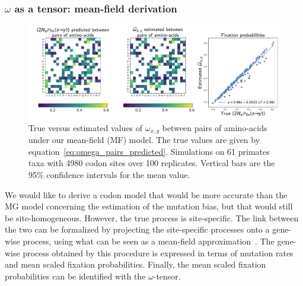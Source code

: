 \documentclass{article}
\newcommand{\aaSource}{x}
\newcommand{\aaTarget}{y}
\begin{document}
\subsubsection{\texorpdfstring{$\omega$}{ω} as a tensor: mean-field derivation}

\begin{figure}[!htb]
 \centering
 \includegraphics[width=\linewidth, page=1]{figure3}
 \caption[Estimation of fixation probability]{
  True versus estimated values of $\omega_{\aaSource, \aaTarget}$ between pairs of amino-acids under our mean-field (MF) model.
  The true values are given by equation~\ref{eq:omega_pairs_predicted}.
  Simulations on 61 primates taxa with 4980 codon sites over 100 replicates.
Vertical bars are the 95\% confidence intervals for the mean value.
 }
 \label{fig:omega-inference}
\end{figure}

We would like to derive a codon model that would be more accurate than the MG model concerning the estimation of the mutation bias, but that would still be site-homogeneous.
However, the true process is site-specific.
The link between the two can be formalized by projecting the site-specific processes onto a gene-wise process, using what can be seen as a mean-field approximation~\citep{Goldstein2016}.
The gene-wise process obtained by this procedure is expressed in terms of mutation rates and mean scaled fixation probabilities.
Finally, the mean scaled fixation probabilities can be identified with the $\omega$-tensor.
\end{document}
